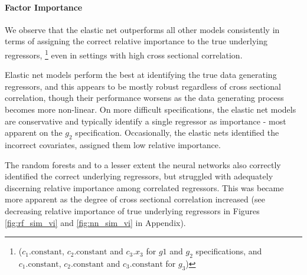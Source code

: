 \documentclass{article}
\begin{document}

\paragraph{Factor Importance}
We observe that the elastic net outperforms all other models consistently in terms of assigning the correct relative importance to the true underlying regressors, \footnote{($c_1.\text{constant}$, $c_2.\text{constant}$ and $c_3.x_3$ for $g1$ and $g_2$ specifications, and $c_1.\text{constant}$, $c_2.\text{constant}$ and $c_3.\text{constant}$ for $g_3$)} even in settings with high cross sectional correlation. 

Elastic net models perform the best at identifying the true data generating regressors, and  this appears to be mostly robust regardless of cross sectional correlation, though their performance worsens as the data generating process becomes more non-linear. On more difficult specifications, the elastic net models are conservative and typically identify a single regressor as importance - most apparent on the $g_2$ specification. Occasionally, the elastic nets identified the incorrect covariates, assigned them low relative importance.

The random forests and to a lesser extent the neural networks also correctly identified the correct underlying regressors, but struggled with adequately discerning relative importance among correlated regressors. This was became more apparent as the degree of cross sectional correlation increased (see decreasing relative importance of true underlying regressors in Figures \ref{fig:rf_sim_vi} and \ref{fig:nn_sim_vi} in Appendix). 

\end{document}
